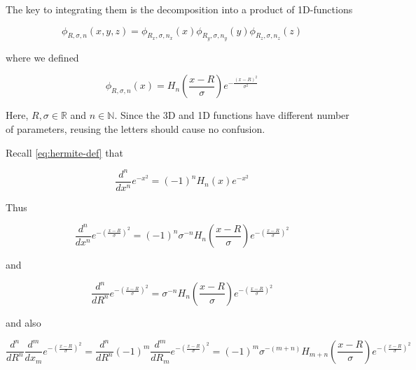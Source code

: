\documentclass{article}
\begin{document}
\begin{appendices}
The key to integrating them is the decomposition into a product of 1D-functions

\begin{equation} \label{eq:hgto-decomposition-1d}
\phi_{R,\sigma,n}(x,y,z) = \phi_{R_x,\sigma,n_x}(x)\phi_{R_y,\sigma,n_y}(y)\phi_{R_z,\sigma,n_z}(z)
\end{equation}

where we defined

\begin{equation}
\phi_{R,\sigma,n}(x) = H_n\left(\frac{x-R}{\sigma}\right) e^{-\frac{(x-R)^2}{\sigma^2}}
\end{equation}

Here, \begin{math}R,\sigma \in \mathbb{R}\end{math} and \begin{math}n \in \mathbb{N}\end{math}. Since the 3D and 1D functions have different number of parameters, reusing the letters should cause no confusion.

Recall \eqref{eq:hermite-def} that

\begin{equation}
\frac{d^n}{dx^n}e^{-x^2} = (-1)^n H_n(x) e^{-x^2}
\end{equation}

Thus

\begin{equation} \label{eq:gaussian-der-hermite-1}
\frac{d^n}{dx^n}e^{-\left(\frac{x-R}{\sigma}\right)^2} = (-1)^n \sigma^{-n} H_n \left(\frac{x-R}{\sigma}\right) e^{-\left(\frac{x-R}{\sigma}\right)^2}
\end{equation}

and

\begin{equation} \label{eq:gaussian-der-hermite-2}
\frac{d^n}{dR^n}e^{-\left(\frac{x-R}{\sigma}\right)^2} = \sigma^{-n} H_n \left(\frac{x-R}{\sigma}\right) e^{-\left(\frac{x-R}{\sigma}\right)^2}
\end{equation}

and also

\begin{equation} \label{eq:gaussian-der-hermite-3}
\frac{d^n}{dR^n}\frac{d^m}{dx_m}e^{-\left(\frac{x-R}{\sigma}\right)^2} = \frac{d^n}{dR^n}(-1)^m\frac{d^m}{dR_m}e^{-\left(\frac{x-R}{\sigma}\right)^2} =
(-1)^m \sigma^{-(m+n)} H_{m+n} \left(\frac{x-R}{\sigma}\right) e^{-\left(\frac{x-R}{\sigma}\right)^2}
\end{equation}


\end{appendices}
\end{document}
